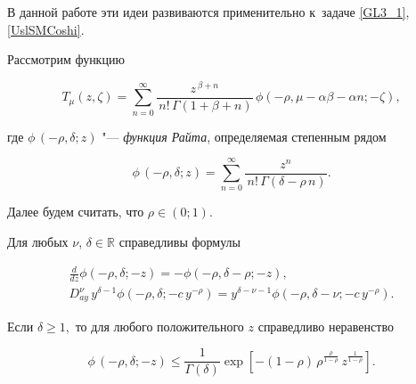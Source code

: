 В данной работе эти идеи развиваются применительно к~задаче \eqref{GL3_1}, \eqref{UslSMCoshi}.



\smallskip




Рассмотрим функцию

\begin{equation} \label{T(z,zeta)}  

T_{\mu}(z,\zeta)=\sum\limits_{n=0}^{\infty}\frac{z^{\,\beta+n}}{\,n!\,\Gamma(1+\beta+n)}\,\phi\left(-\rho,\mu-\alpha\beta-\alpha n; -\zeta\right),

\end{equation}    

где  $\phi\,(-\rho,\delta;z)$ "--- {\it функция Райта}, определяемая степенным рядом \cite{Pskhu, GorenfloLuchkoMainardi}

$$

\phi\,(-\rho,\delta;z)=\sum\limits_{n=0}^{\infty}\frac{z^{n}}{\,n!\,\Gamma(\delta-\rho\, n)}.

$$



Далее будем считать, что $\rho\in(0;1).$ 

Для любых $\nu$, $\delta\in \mathbb{R}$ справедливы формулы  \cite[с.~26, 44]{Pskhu}

\begin{gather}\label{diff_x}

\frac{d}{dz}\phi(-\rho,\delta;-z)=-\phi(-\rho,\delta-\rho;-z),

\\

\label{diff_Right}

D_{ay}^{\nu} \,y^{\delta-1}\phi(-\rho,\delta;-c\,y^{-\rho})=y^{\delta-\nu-1}\phi(-\rho,\delta-\nu;-c\,y^{-\rho}).

\end{gather}



\smallskip



\begin{lemma}[1]Если $\delta\geqslant 1,$ то для любого положительного $z$ справедливо нера\-вен\-ство~{\rm \cite[с.~47]{Pskhu} }

\begin{equation}\label{Right_delta>1}

\phi\,(-\rho,\delta;-z)\leqslant \frac{1}{\Gamma\left( \delta \right)}

\exp\left[-(1-\rho)\,\rho^{\frac{\rho}{1-\rho}}\, z^{\frac{1}{1-\rho}} \right].

\end{equation}

\end{lemma}



